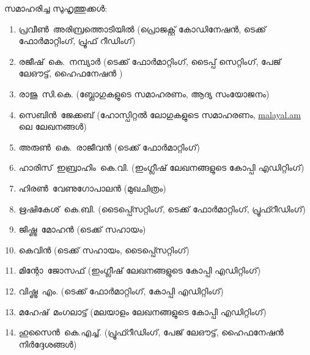 ﻿
സമാഹരിച്ച സുഹൃത്തുക്കള്‍:

\begin{enumerate}
 \itemsep0em
 \item \mbox{പ്രവീണ്‍ അരിമ്പ്രത്തൊടിയിൽ} (പ്രൊജക്റ്റ് കോഡിനേഷന്‍, ടെക്ക് ഫോര്‍മാറ്റിംഗ്, പ്രൂഫ് റീഡിംഗ്)
 \item \mbox{രജീഷ് കെ. നമ്പ്യാര്‍} (ടെക്ക് ഫോര്‍മാറ്റിംഗ്, ടൈപ്പ് സെറ്റിംഗ്, പേജ് ലേഔട്ട്, ഹൈഫനേഷന്‍ )
 \item \mbox{രാജു സി.കെ.} (ബ്ലോഗുകളുടെ സമാഹരണം, ആദ്യ സംയോജനം)
 \item \mbox{സെബിന്‍ ജേക്കബ്} (ഹോസ്പിറ്റല്‍ ലോഗുകളുടെ സമാഹരണം, \url{malayal.am} ലെ ലേഖനങ്ങള്‍)
 \item \mbox{അരുണ്‍ കെ. രാജീവൻ} (ടെക്ക് ഫോര്‍മാറ്റിംഗ്)
 \item \mbox{ഹാരിസ് ഇബ്രാഹിം  കെ.വി.} (ഇംഗ്ലീഷ് ലേഖനങ്ങളുടെ കോപ്പി എഡിറ്റിംഗ്)
 \item \mbox{ഹിരണ്‍ വേണുഗോപാലൻ} (മുഖചിത്രം)
 \item \mbox{ഋഷികേശ് കെ.ബി.} (ടൈപ്പ്സെറ്റിംഗ്, ടെക്ക് ഫോര്‍മാറ്റിംഗ്, പ്രൂഫ്റീഡിംഗ്)
 \item \mbox{ജിഷ്ണു മോഹന്‍} (ടെക്ക് സഹായം)  
 \item \mbox{കെവിന്‍} (ടെക്ക് സഹായം, ടൈപ്പ്സെറ്റിംഗ്)
 \item \mbox{മിന്റോ ജോസഫ്} (ഇംഗ്ലീഷ് ലേഖനങ്ങളുടെ കോപ്പി എഡിറ്റിംഗ്)
 \item \mbox{വിഷ്ണു എം.} (ടെക്ക് ഫോര്‍മാറ്റിംഗ്, കോപ്പി എഡിറ്റിംഗ്)
 \item \mbox{മഹേഷ് മംഗലാട്ട്} (മലയാളം ലേഖനങ്ങളുടെ കോപ്പി എഡിറ്റിംഗ്)
 \item \mbox{ഹുസൈന്‍ കെ.എച്ച്.} (പ്രൂഫ്റീഡിംഗ്, പേജ് ലേഔട്ട്, ഹൈഫനേഷന്‍ നിര്‍ദ്ദേശങ്ങള്‍)
\end{enumerate}

\newpage

